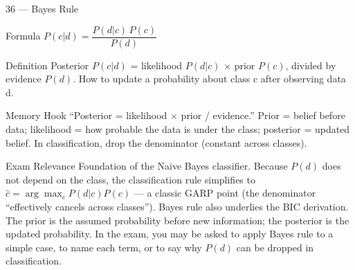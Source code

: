 \documentclass[aspectratio=169,8pt]{beamer}
\begin{document}
	\begin{frame}{36 --- Bayes Rule}
		\begin{block}{Formula}
			$P(c|d) = \dfrac{P(d|c)\,P(c)}{P(d)}$
		\end{block}
		\begin{block}{Definition}
			Posterior $P(c|d)$ = likelihood $P(d|c)$ $\times$ prior $P(c)$, divided by evidence $P(d)$. How to update a probability about class c after observing data d.
		\end{block}
		\begin{block}{Memory Hook}
			``Posterior = likelihood $\times$ prior / evidence.'' Prior = belief before data; likelihood = how probable the data is under the class; posterior = updated belief. In classification, drop the denominator (constant across classes).
		\end{block}
		\begin{block}{Exam Relevance}
			Foundation of the Naive Bayes classifier. Because $P(d)$ does not depend on the class, the classification rule simplifies to $\hat{c} = \arg\max_c P(d|c)P(c)$ --- a classic GARP point (the denominator ``effectively cancels across classes''). Bayes rule also underlies the BIC derivation. The prior is the assumed probability before new information; the posterior is the updated probability. In the exam, you may be asked to apply Bayes rule to a simple case, to name each term, or to say why $P(d)$ can be dropped in classification.
		\end{block}
	\end{frame}
	
\end{document}
